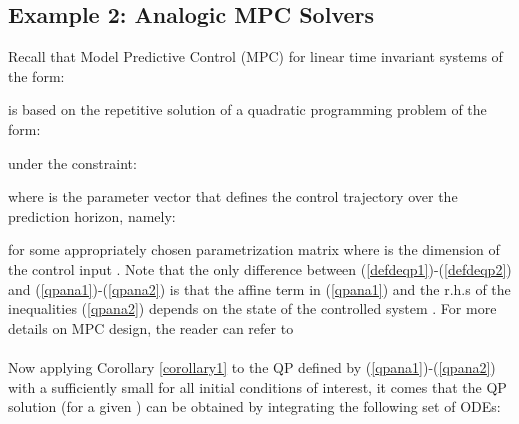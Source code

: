 \documentclass{article}
\begin{document}
\subsection{Example 2: Analogic MPC Solvers} \label{circuits} 
\noindent Recall that Model Predictive Control (MPC) for linear time invariant systems of the form:
 
is based on the repetitive solution of a quadratic programming problem of the form:
 
under the constraint:
 
where  is the parameter vector that defines the control trajectory over the prediction horizon, namely:
  
for some appropriately chosen parametrization matrix  where  is the dimension of the control input . Note that the only difference between (\ref{defdeqp1})-(\ref{defdeqp2}) and (\ref{qpana1})-(\ref{qpana2}) is that the affine term in (\ref{qpana1}) and the r.h.s of the inequalities (\ref{qpana2}) depends on the state of the controlled system . For more details on MPC design, the reader can refer to \cite{Mayne:2000} \ \\ \ \\ 
Now applying Corollary \ref{corollary1} to the QP defined by  (\ref{qpana1})-(\ref{qpana2}) with a sufficiently small  for all initial conditions of interest, it comes that the QP solution (for a given ) can be obtained by integrating the following set of ODEs:
 
\end{document}
